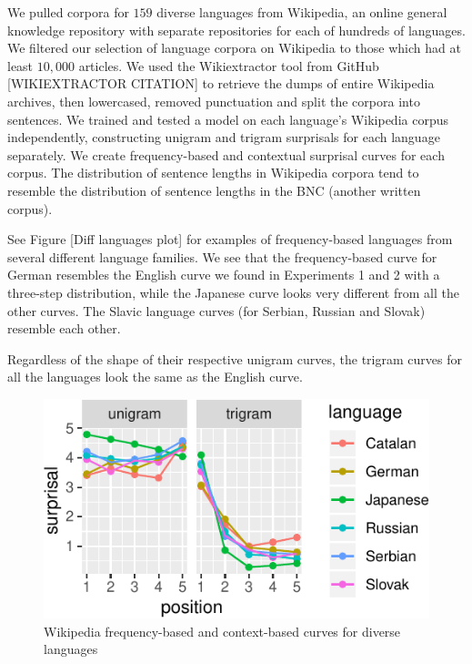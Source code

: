 \documentclass[10pt, letterpaper]{article}
\newenvironment{CodeChunk}{}{}
\begin{document}
We pulled corpora for \(159\) diverse languages from Wikipedia, an
online general knowledge repository with separate repositories for each
of hundreds of languages. We filtered our selection of language corpora
on Wikipedia to those which had at least \(10,000\) articles. We used
the Wikiextractor tool from GitHub {[}WIKIEXTRACTOR CITATION{]} to
retrieve the dumps of entire Wikipedia archives, then lowercased,
removed punctuation and split the corpora into sentences. We trained and
tested a model on each language's Wikipedia corpus independently,
constructing unigram and trigram surprisals for each language
separately. We create frequency-based and contextual surprisal curves
for each corpus. The distribution of sentence lengths in Wikipedia
corpora tend to resemble the distribution of sentence lengths in the BNC
(another written corpus).

See Figure {[}Diff languages plot{]} for examples of frequency-based
languages from several different language families. We see that the
frequency-based curve for German resembles the English curve we found in
Experiments 1 and 2 with a three-step distribution, while the Japanese
curve looks very different from all the other curves. The Slavic
language curves (for Serbian, Russian and Slovak) resemble each other.

Regardless of the shape of their respective unigram curves, the trigram
curves for all the languages look the same as the English curve.

\begin{CodeChunk}
\begin{figure}[tb]
\includegraphics{figs/diff-languages-plot-1} \caption[Wikipedia frequency-based and context-based curves for diverse languages]{Wikipedia frequency-based and context-based curves for diverse languages}\label{fig:diff-languages-plot}
\end{figure}
\end{CodeChunk}
\end{document}
